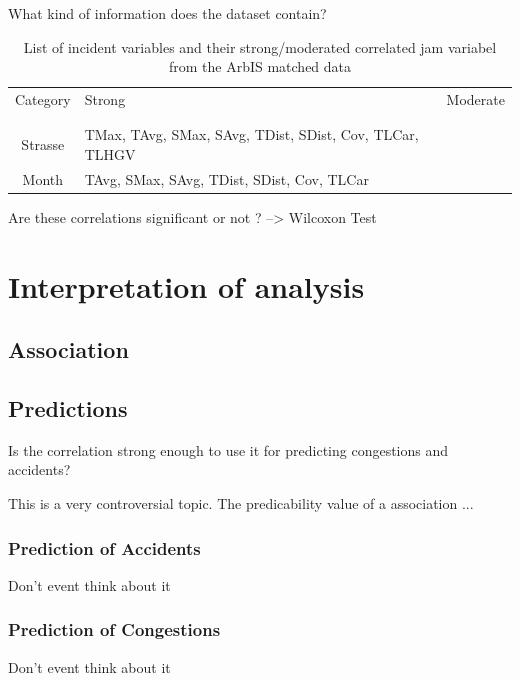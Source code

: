 \documentclass[a4paper,headsepline,footsepline,fontsize=11pt,BCOR=12mm,DIV=12]{report}
\begin{document}
What kind of information does the dataset contain?

\noindent
\begin{table}[h!]
	\centering
	\begin{tabular}{c|l|l}  
		Category & Strong & Moderate \\
		\\[-1em]
		\hline
		\\[-1em]
		Strasse & TMax, TAvg, SMax, SAvg, TDist, SDist, Cov, TLCar, TLHGV & \\ 
 		Month & TAvg, SMax, SAvg, TDist, SDist, Cov, TLCar & \\
	\end{tabular}
	\caption{List of incident variables and their strong/moderated correlated jam variabel from the ArbIS matched data}
\end{table}

Are these correlations significant or not ? --> Wilcoxon Test




\chapter{Interpretation of analysis}

\section{Association}

\section{Predictions}
Is the correlation strong enough to use it for predicting congestions and accidents?

This is a very controversial topic. The predicability value of a association ...

\subsection{Prediction of Accidents}
Don't event think about it

\subsection{Prediction of Congestions}
Don't event think about it
\end{document}
